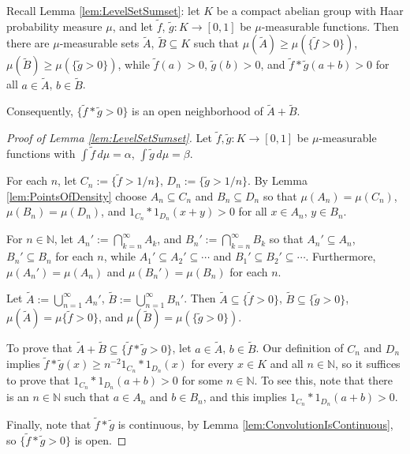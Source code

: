 \documentclass[12pt]{amsart} \usepackage{amsmath,centernot,amssymb,leftindex}
\numberwithin{theorem}{section}
\numberwithin{equation}{section}
\theoremstyle{definition}
\begin{document}
Recall Lemma  \ref{lem:LevelSetSumset}:  	let $K$ be a compact abelian group with Haar probability measure $\mu$, and let $\tilde{f}$, $\tilde{g}:K\to [0,1]$ be $\mu$-measurable functions. Then there are $\mu$-measurable sets $\tilde{A}$, $\tilde{B}\subseteq K$ such that $\mu(\tilde{A})\geq \mu(\{\tilde{f}>0\})$, $\mu(\tilde{B})\geq \mu(\{\tilde{g}>0\})$, while  
$\tilde{f}(a)>0$, $\tilde{g}(b)>0$, and $\tilde{f}*\tilde{g}(a+b)>0$ for all $a\in \tilde{A}$, $b\in \tilde{B}$.

Consequently, $\{\tilde{f}*\tilde{g}>0\}$ is an open neighborhood of $\tilde{A}+\tilde{B}$.

\begin{proof}[Proof of Lemma \ref{lem:LevelSetSumset}]
	Let $\tilde{f}, \tilde{g}:K\to [0,1]$ be $\mu$-measurable functions with $\int\tilde{f}\, d\mu=\alpha$, $\int\tilde{g}\, d\mu=\beta$.
	
	For each $n$, let $C_n:=\{\tilde{f}>1/n\}$, $D_n:=\{\tilde{g}>1/n\}$.  By Lemma \ref{lem:PointsOfDensity} choose  $A_n\subseteq C_n$ and $B_n\subseteq D_n$ so that $\mu(A_n)=\mu(C_n)$, $\mu(B_n)=\mu(D_n)$, and $1_{C_n}*1_{D_n}(x+y)>0$ for all $x\in A_n$, $y\in B_n$.
	
	For $n\in \mathbb N$, let $A_n':= \bigcap_{k=n}^{\infty} A_k$,  and $B_n':= \bigcap_{k=n}^{\infty} B_k$ so that $A_n'\subseteq A_n$, $B_n'\subseteq B_n$ for each $n$, while $A_1'\subseteq A_2' \subseteq \cdots$ and $B_1'\subseteq B_2' \subseteq \cdots$.  Furthermore, $\mu(A_n')=\mu(A_n)$ and $\mu(B_n')=\mu(B_n)$ for each $n$.
	
	Let $\tilde{A}:=\bigcup_{n=1}^\infty  A_n'$, $\tilde{B}:=\bigcup_{n=1}^\infty B_n'$.  Then $\tilde{A}\subseteq \{\tilde{f}>0\}$, $\tilde{B}\subseteq \{\tilde{g}>0\}$, $\mu(\tilde{A})=\mu\{\tilde{f}>0\}$, and $\mu(\tilde{B})=\mu(\{\tilde{g}>0\})$.  
	
	To prove that $\tilde{A}+\tilde{B}\subseteq \{\tilde{f}*\tilde{g}>0\}$, let $a\in \tilde{A}$, $b\in \tilde{B}$.  Our definition of $C_{n}$ and $D_{n}$ implies $\tilde{f}*\tilde{g}(x)\geq n^{-2}1_{C_{n}}*1_{D_{n}}(x)$ for every $x\in K$ and all $n\in \mathbb N$, so it suffices to prove that $1_{C_{n}}*1_{D_{n}}(a+b)>0$ for some $n\in \mathbb N$. To see this, note that there is an $n\in \mathbb N$ such that $a\in A_{n}$ and $b\in B_{n}$, and this implies $1_{C_{n}}*1_{D_{n}}(a+b)>0$.
	
	Finally, note that $\tilde{f}*\tilde{g}$ is continuous, by Lemma \ref{lem:ConvolutionIsContinuous}, so $\{\tilde{f}*\tilde{g}>0\}$ is open.
\end{proof}
\end{document}

